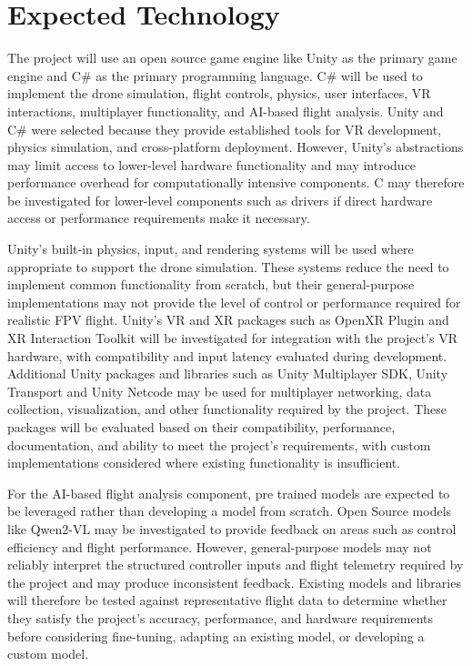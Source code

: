 \documentclass{article}
\begin{document}
\section{Expected Technology}


\noindent The project will use an open source game engine like Unity as the primary game engine and C\# as the primary programming language. C\# will be used to implement the drone simulation, flight controls, physics, user interfaces, VR interactions, multiplayer functionality, and AI-based flight analysis. Unity and C\# were selected because they provide established tools for VR development, physics simulation, and cross-platform deployment. However, Unity's abstractions may limit access to lower-level hardware functionality and may introduce performance overhead for computationally intensive components. C may therefore be investigated for lower-level components such as drivers if direct hardware access or performance requirements make it necessary.

\vspace{0.75em}

\noindent Unity's built-in physics, input, and rendering systems will be used where appropriate to support the drone simulation. These systems reduce the need to implement common functionality from scratch, but their general-purpose implementations may not provide the level of control or performance required for realistic FPV flight. Unity's VR and XR packages such as OpenXR Plugin and XR Interaction Toolkit will be investigated for integration with the project's VR hardware, with compatibility and input latency evaluated during development. Additional Unity packages and libraries such as Unity Multiplayer SDK, Unity Transport and Unity Netcode may be used for multiplayer networking, data collection, visualization, and other functionality required by the project. These packages will be evaluated based on their compatibility, performance, documentation, and ability to meet the project's requirements, with custom implementations considered where existing functionality is insufficient.

\vspace{0.75em}

\noindent For the AI-based flight analysis component, pre trained models are expected to be leveraged rather than developing a model from scratch. Open Source models like Qwen2-VL may be investigated to provide feedback on areas such as control efficiency and flight performance. However, general-purpose models may not reliably interpret the structured controller inputs and flight telemetry required by the project and may produce inconsistent feedback. Existing models and libraries will therefore be tested against representative flight data to determine whether they satisfy the project's accuracy, performance, and hardware requirements before considering fine-tuning, adapting an existing model, or developing a custom model.
\end{document}
